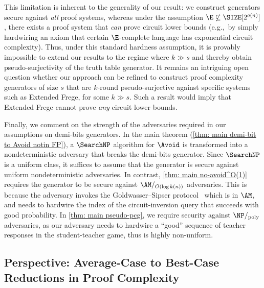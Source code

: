 \documentclass[10pt,a4paper]{article}
\theoremstyle{definition}
\theoremstyle{remark}
\renewcommand{\poly}{\mathrm{poly}}
\begin{document}
This limitation is inherent to the generality of our result: we construct generators secure against \emph{all} proof systems, whereas under the assumption $\E\not\subseteq \SIZE[2^{o(n)}]$, there exists a proof system that \emph{can} prove circuit lower bounds (e.g.,~by simply hardwiring an axiom that certain $\E$-complete language has exponential circuit complexity). Thus, under this standard hardness assumption, it is provably impossible to extend our results to the regime where $k \gg s$ and thereby obtain pseudo-surjectivity of the truth table generator. It remains an intriguing open question whether our approach can be refined to construct proof complexity generators of size $s$ that are $k$-round pseudo-surjective against specific systems such as Extended Frege, for some $k \gg s$. Such a result would imply that Extended Frege cannot prove \emph{any} circuit lower bounds.












Finally, we comment on the strength of the adversaries required in our assumptions on demi-bits generators. In the main theorem (\autoref{thm: main demi-bit to Avoid notin FP}), a $\SearchNP$ algorithm for $\Avoid$ is transformed into a nondeterministic adversary that breaks the demi-bits generator. Since $\SearchNP$ is a uniform class, it suffices to assume that the generator is secure against uniform nondeterministic adversaries. In contrast, \autoref{thm: main no-avoid^O(1)} requires the generator to be secure against $\AM/_{O(\log k(n))}$ adversaries. This is because the adversary invokes the Goldwasser--Sipser protocol~\cite{GS86} which is in $\AM$, and needs to hardwire the index of the circuit-inversion query that succeeds with good probability. In \autoref{thm: main pseudo-pcg}, we require security against $\NP/_\poly$ adversaries, as our adversary needs to hardwire a ``good'' sequence of teacher responses in the student-teacher game, thus is highly non-uniform.









\subsection{Perspective: Average-Case to Best-Case Reductions in Proof Complexity}\label{sec: perspective on best-case complexity}
\end{document}
